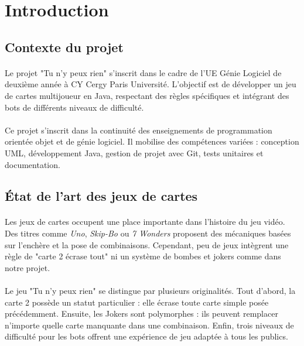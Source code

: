 \newpage
\section{Introduction}
\label{sec:introduction}

\subsection{Contexte du projet}
\paragraph{} Le projet "Tu n'y peux rien" s'inscrit dans le cadre de l'UE Génie Logiciel de deuxième année à CY Cergy Paris Université. L'objectif est de développer un jeu de cartes multijoueur en Java, respectant des règles spécifiques et intégrant des bots de différents niveaux de difficulté.

\paragraph{} Ce projet s'inscrit dans la continuité des enseignements de programmation orientée objet et de génie logiciel. Il mobilise des compétences variées : conception UML, développement Java, gestion de projet avec Git, tests unitaires et documentation.

\subsection{État de l'art des jeux de cartes}
\paragraph{} Les jeux de cartes occupent une place importante dans l'histoire du jeu vidéo. Des titres comme \textit{Uno}, \textit{Skip-Bo} ou \textit{7 Wonders} proposent des mécaniques basées sur l'enchère et la pose de combinaisons. Cependant, peu de jeux intègrent une règle de "carte 2 écrase tout" ni un système de bombes et jokers comme dans notre projet.

\paragraph{} Le jeu "Tu n'y peux rien" se distingue par plusieurs originalités. Tout d'abord, la carte 2 possède un statut particulier : elle écrase toute carte simple posée précédemment. Ensuite, les Jokers sont polymorphes : ils peuvent remplacer n'importe quelle carte manquante dans une combinaison. Enfin, trois niveaux de difficulté pour les bots offrent une expérience de jeu adaptée à tous les publics.

